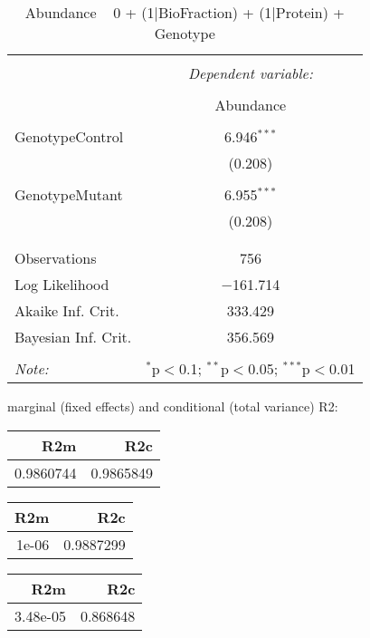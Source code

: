 \documentclass[11pt]{report}
\begin{document}
\begin{table}[!htbp] \centering 
  \caption{Abundance ~ 0 + (1|BioFraction) + (1|Protein) + Genotype} 
  \label{} 
\begin{tabular}{@{\extracolsep{5pt}}lc} 
\\[-1.8ex]\hline 
\hline \\[-1.8ex] 
 & \multicolumn{1}{c}{\textit{Dependent variable:}} \\ 
\cline{2-2} 
\\[-1.8ex] & Abundance \\ 
\hline \\[-1.8ex] 
 GenotypeControl & 6.946$^{***}$ \\ 
  & (0.208) \\ 
  & \\ 
 GenotypeMutant & 6.955$^{***}$ \\ 
  & (0.208) \\ 
  & \\ 
\hline \\[-1.8ex] 
Observations & 756 \\ 
Log Likelihood & $-$161.714 \\ 
Akaike Inf. Crit. & 333.429 \\ 
Bayesian Inf. Crit. & 356.569 \\ 
\hline 
\hline \\[-1.8ex] 
\textit{Note:}  & \multicolumn{1}{r}{$^{*}$p$<$0.1; $^{**}$p$<$0.05; $^{***}$p$<$0.01} \\ 
\end{tabular} 
\end{table} 
marginal (fixed effects) and conditional (total variance) R2:

\begin{tabular}{r|r}
\hline
R2m & R2c\\
\hline
0.9860744 & 0.9865849\\
\hline
\end{tabular}

\begin{tabular}{r|r}
\hline
R2m & R2c\\
\hline
1e-06 & 0.9887299\\
\hline
\end{tabular}

\begin{tabular}{r|r}
\hline
R2m & R2c\\
\hline
3.48e-05 & 0.868648\\
\hline
\end{tabular}
\end{document}

